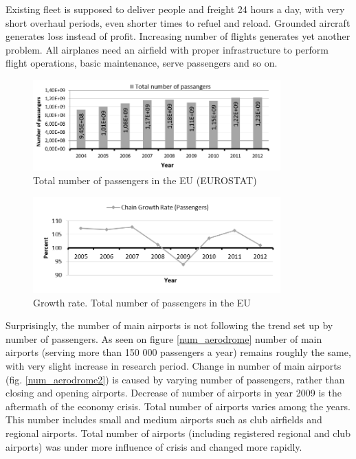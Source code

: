 Existing fleet is supposed to deliver people and freight 24 hours a day, with very short overhaul periods, even shorter times to refuel and reload. Grounded aircraft generates loss instead of profit. Increasing number of flights generates yet another problem. All airplanes need an airfield with proper infrastructure to perform flight operations, basic maintenance, serve passengers and so on.

\begin{figure}[h!]
\centering %
\includegraphics[width=0.85\textwidth]{Pictures/num_pass.png}
\caption{Total number of passengers in the EU (EUROSTAT)}
\label{num_pass}
\end{figure}

\begin{figure}[h!]
\centering %
\includegraphics[width=0.85\textwidth]{Pictures/num_pass2.png}
\caption{Growth rate. Total number of passengers in the EU}
\label{num_pass2}
\end{figure}

Surprisingly, the number of main airports is not following the trend set up by number of passengers.  As seen on figure \ref{num_aerodrome} number of main airports (serving more than 150 000 passengers a year) remains roughly the same, with very slight increase in research period. Change in number of main airports (fig. \ref{num_aerodrome2}) is caused by varying number of passengers, rather than closing and opening airports. Decrease of number of airports in year 2009 is the aftermath of the economy crisis. Total number of airports varies among the years. This number includes small and medium airports such as club airfields and regional airports. Total number of airports (including registered regional and club airports) was under more influence of crisis and changed more rapidly.

